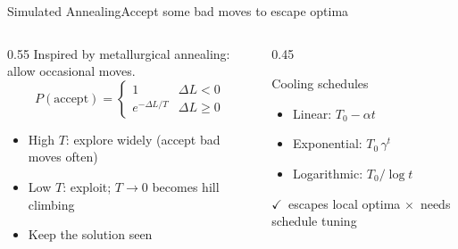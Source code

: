 \documentclass[aspectratio=169,11pt]{beamer}
\newcommand{\cmark}{\textcolor{SuccessGreen}{\ensuremath{\checkmark}}}
\newcommand{\xmark}{\textcolor{AlertRed}{\ensuremath{\times}}}
\begin{document}
\begin{frame}{Simulated Annealing}{Accept some bad moves to escape optima}
  \begin{columns}[T]
    \begin{column}{0.55\textwidth}
      Inspired by metallurgical annealing: allow occasional  moves.
      \[ P(\text{accept}) = \begin{cases} 1 & \Delta L < 0 \\ e^{-\Delta L / T} & \Delta L \ge 0 \end{cases} \]
      \begin{itemize}\small
        \item High $T$: explore widely (accept bad moves often)
        \item Low $T$: exploit; $T \to 0$ becomes hill climbing
        \item Keep the  solution seen
      \end{itemize}
    \end{column}
    \begin{column}{0.45\textwidth}
      \begin{block}{Cooling schedules}
        \small
        \begin{itemize}
          \item Linear: $T_0 - \alpha t$
          \item Exponential: $T_0\,\gamma^{t}$
          \item Logarithmic: $T_0 / \log t$
        \end{itemize}
      \end{block}
      \centering\scriptsize
      \cmark\ escapes local optima \quad \xmark\ needs schedule tuning
    \end{column}
  \end{columns}
\end{frame}
\end{document}
